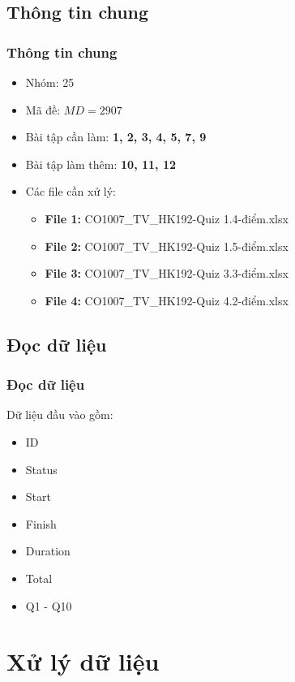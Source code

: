 \documentclass[english,10pt,table]{beamer}
\begin{document}
\subsection{Thông tin chung}
\frame
{
\frametitle{Thông tin chung}
\begin{itemize}
    \item Nhóm: 25\\[6pt]
    \item Mã đề: $MD = 2907$\\[6pt]
    \item Bài tập cần làm: \textbf{1, 2, 3, 4, 5, 7, 9}\\[6pt]
    \item Bài tập làm thêm: \textbf{10, 11, 12}\\[6pt]
    \item Các file cần xử lý:
    \begin{itemize}
    	\item {\bf File 1:} CO1007\_TV\_HK192-Quiz 1.4-điểm.xlsx
	    \item {\bf File 2:} CO1007\_TV\_HK192-Quiz 1.5-điểm.xlsx	
    	\item {\bf File 3:} CO1007\_TV\_HK192-Quiz 3.3-điểm.xlsx
	    \item {\bf File 4:} CO1007\_TV\_HK192-Quiz 4.2-điểm.xlsx
    \end{itemize}
\end{itemize}
}

\subsection{Đọc dữ liệu}
\frame
{
\frametitle{Đọc dữ liệu}
Dữ liệu đầu vào gồm:
\begin{itemize}
    \item ID
    \item Status
    \item Start
    \item Finish
    \item Duration
    \item Total
    \item Q1 - Q10
\end{itemize}
}
\section{Xử lý dữ liệu}
\end{document}
